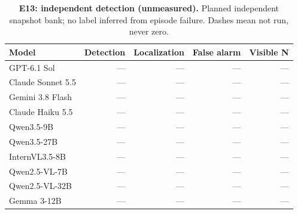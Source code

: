 \begin{table}[!ht]
\centering\small
\caption{\textbf{E13: independent detection (unmeasured).} Planned independent snapshot bank; no label inferred from episode failure. Dashes mean not run, never zero.}
\begin{tabularx}{\textwidth}{@{}Xrrrr@{}}\toprule
Model & Detection & Localization & False alarm & Visible N\\\midrule
GPT-6.1 Sol & --- & --- & --- & ---\\
Claude Sonnet 5.5 & --- & --- & --- & ---\\
Gemini 3.8 Flash & --- & --- & --- & ---\\
Claude Haiku 5.5 & --- & --- & --- & ---\\
Qwen3.5-9B & --- & --- & --- & ---\\
Qwen3.5-27B & --- & --- & --- & ---\\
InternVL3.5-8B & --- & --- & --- & ---\\
Qwen2.5-VL-7B & --- & --- & --- & ---\\
Qwen2.5-VL-32B & --- & --- & --- & ---\\
Gemma 3-12B & --- & --- & --- & ---\\
\bottomrule
\end{tabularx}
\end{table}
